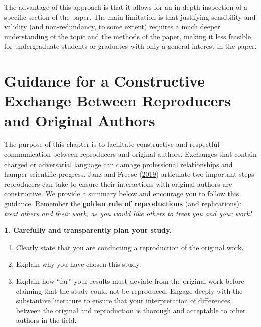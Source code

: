\documentclass[]{book}
\providecommand{\tightlist}{%
  \setlength{\itemsep}{0pt}\setlength{\parskip}{0pt}}
\begin{document}
The advantage of this approach is that it allows for an in-depth inspection of a specific section of the paper. The main limitation is that justifying sensibility and validity (and non-redundancy, to some extent) requires a much deeper understanding of the topic and the methods of the paper, making it less feasible for undergraduate students or graduates with only a general interest in the paper. \citep[what does it mean to have only a general interest in the paper?]{fhoces}

\hypertarget{guidance-for-a-constructive-exchange-between-reproducers-and-original-authors}{%
\chapter{Guidance for a Constructive Exchange Between Reproducers and Original Authors}\label{guidance-for-a-constructive-exchange-between-reproducers-and-original-authors}}

The purpose of this chapter is to facilitate constructive and respectful communication between reproducers and original authors. Exchanges that contain charged or adversarial language can damage professional relationships and hamper scientific progress. Janz and Freese (\href{https://www.mzes.uni-mannheim.de/openscience/wp-content/uploads/2019/01/Janz-Freese_-Good-and-Bad-Replications-1.pdf}{2019}) articulate two important steps reproducers can take to ensure their interactions with original authors are constructive. We provide a summary below and encourage you to follow this guidance. Remember the \textbf{golden rule of reproductions} (and replications): \emph{treat others and their work, as you would like others to treat you and your work!}

\textbf{1. Carefully and transparently plan your study.}

\begin{enumerate}
\def\labelenumi{\alph{enumi}.}
\tightlist
\item
  Clearly state that you are conducting a reproduction of the original work.\\
\item
  Explain why you have chosen this study.
\item
  Explain how ``far'' your results must deviate from the original work before claiming that the study could not be reproduced. Engage deeply with the substantive literature to ensure that your interpretation of differences between the original and reproduction is thorough and acceptable to other authors in the field.
\end{enumerate}
\end{document}
